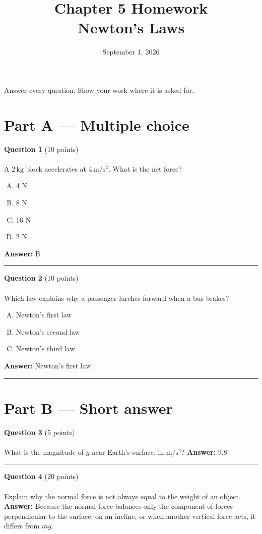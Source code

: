 \documentclass[12pt]{article}
\title{Chapter 5 Homework \\ Newton's Laws}
\date{September 1, 2026}
\begin{document}
\maketitle

Answer every question. Show your work where it is asked for.

\section*{Part A — Multiple choice}

\noindent\textbf{Question 1} (10 points)\\\\
A $2\,\mathrm{kg}$ block accelerates at $4\,\mathrm{m/s^2}$. What is the net force?
\begin{enumerate}[(A)]
  \item 4 N
  \item 8 N
  \item 16 N
  \item 2 N
\end{enumerate}
\textbf{Answer:} B

\bigskip\hrule\bigskip

\noindent\textbf{Question 2} (10 points)\\\\
Which law explains why a passenger lurches forward when a bus brakes?
\begin{enumerate}[(A)]
  \item Newton's first law
  \item Newton's second law
  \item Newton's third law
\end{enumerate}
\textbf{Answer:} Newton's first law   %

\bigskip\hrule\bigskip

\section*{Part B — Short answer}

\noindent\textbf{Question 3} (5 points)\\\\
What is the magnitude of $g$ near Earth's surface, in $\mathrm{m/s^2}$?
\textbf{Answer:} 9.8

\bigskip\hrule\bigskip

\noindent\textbf{Question 4} (20 points)\\\\
Explain why the normal force is not always equal to the weight of an object.
\textbf{Answer:} Because the normal force balances only the component of forces
perpendicular to the surface; on an incline, or when another vertical force acts,
it differs from $mg$.
\end{document}
